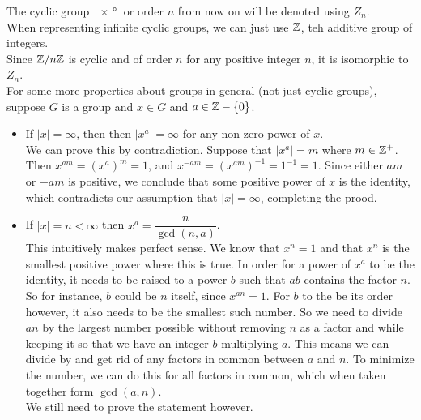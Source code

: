 \documentclass[12pt]{article}
\begin{document}
    The cyclic group $\ang{x}$ or order $n$
    from now on will be denoted using $Z_n$. \\
    When representing infinite cyclic groups,
    we can just use $\mathbb{Z}$, teh additive group of integers. \\

    Since $\mathbb{Z}/n\mathbb{Z}$ is cyclic and of order $n$
    for any positive integer $n$,
    it is isomorphic to $Z_n$. \\

    For some more properties about groups in general
    (not just cyclic groups),
    suppose $G$ is a group and $x \in G$ and $a \in \mathbb{Z} - \{0\}$.
    \begin{itemize}[label=$\diamond$]
        \item 
            If $|x| = \infty$, then 
            then $|x^a| = \infty$ for any non-zero power of $x$. \\
            We can prove this by contradiction.
            Suppose that $|x^a| = m$ where $m \in \mathbb{Z}^+$.
            Then $x^{am} = (x^a)^m = 1$,
            and $x^{-am} = (x^{am})^{-1} = 1^{-1} = 1$.
            Since either $am$ or $-am$ is positive,
            we conclude that some positive power of $x$
            is the identity,
            which contradicts our assumption that $|x| = \infty$,
            completing the prood.
        \item
            If $|x| = n < \infty$
            then $x^a = \dfrac{n}{\gcd(n, a)}$. \\
            This intuitively makes perfect sense.
            We know that $x^n = 1$ and that $x^n$
            is the smallest positive power where this is true.
            In order for a power of $x^a$ to be the identity,
            it needs to be raised to a power $b$
            such that $ab$ contains the factor $n$.
            So for instance, $b$ could be $n$ itself,
            since $x^{an} = 1$. 
            For $b$ to the be its order however,
            it also needs to be the smallest such number.
            So we need to divide $an$ by the largest
            number possible without removing $n$ as a factor
            and while keeping it so that we have
            an integer $b$ multiplying $a$.
            This means we can divide by and get rid of 
            any factors in common between $a$ and $n$.
            To minimize the number,
            we can do this for all factors in common,
            which when taken together form $\gcd(a, n)$. \\
            We still need to prove the statement however.

\end{itemize}
\end{document}
